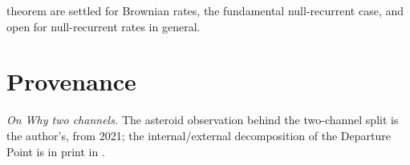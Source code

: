 theorem are settled for Brownian rates, the fundamental
null-recurrent case, and open for null-recurrent rates in
general.


\section*{Provenance}

\noindent\textit{On Why two channels.} The asteroid observation behind the two-channel split is the author's, from 2021; the internal/external decomposition of the Departure Point is in print in \cite{GoldenScience2022}.

\printbibliography

